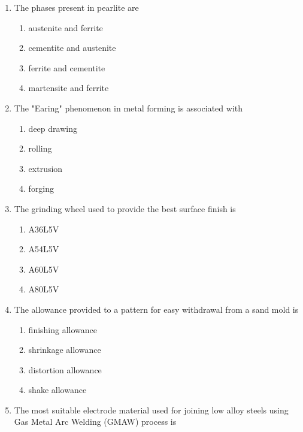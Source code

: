 \documentclass[journal,11pt,onecolumn]{IEEEtran}
\begin{document}
\begin{enumerate}[resume]
    \item The phases present in pearlite are

          \begin{enumerate}
              \item austenite and ferrite
              \item cementite and austenite
              \item ferrite and cementite
              \item martensite and ferrite
          \end{enumerate}

    \item The "Earing" phenomenon in metal forming is associated with

          \begin{enumerate}
              \item deep drawing
              \item rolling
              \item extrusion
              \item forging
          \end{enumerate}

    \item The grinding wheel used to provide the best surface finish is

          \begin{enumerate}
              \item A36L5V
              \item A54L5V
              \item A60L5V
              \item A80L5V
          \end{enumerate}

    \item The allowance provided to a pattern for easy withdrawal from a sand mold is

          \begin{enumerate}
              \item finishing allowance
              \item shrinkage allowance
              \item distortion allowance
              \item shake allowance
          \end{enumerate}

    \item The most suitable electrode material used for joining low alloy steels using Gas Metal Arc Welding (GMAW) process is


\end{enumerate}
\end{document}
